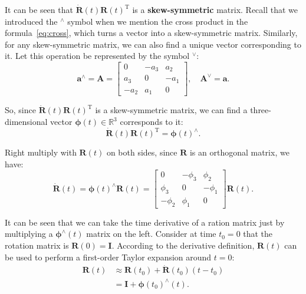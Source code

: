 It can be seen that $\dot{\mathbf{R}} (t) \mathbf{R} {(t)^\mathrm{T}}$ is a \textbf{skew-symmetric} matrix. Recall that we introduced the $^\wedge$ symbol when we mention the cross product in the formula~\eqref{eq:cross}, which turns a vector into a skew-symmetric matrix. Similarly, for any skew-symmetric matrix, we can also find a unique vector corresponding to it. Let this operation be represented by the symbol $^{\vee}$:
\begin{equation}
{\mathbf{a}^ \wedge } = \mathbf{A} = \left[ {\begin{array}{*{20}{c}}
    0&{ - {a_3}}&{{a_2}}\\
    {{a_3}}&0&{ - {a_1}}\\
    { - {a_2}}&{{a_1}}&0
    \end{array}} \right], \quad
{ \mathbf{A}^ \vee } = \mathbf{a}.
\end{equation}

So, since $\dot{\mathbf{R}} (t) \mathbf{R} {(t)^\mathrm{T}}$ is a skew-symmetric matrix, we can find a three-dimensional vector $\boldsymbol{\phi} (t) \in \mathbb{R}^3$ corresponds to it:
\[
\dot{\mathbf{R}} (t) \mathbf{R}(t)^\mathrm{T} = \boldsymbol{\phi} (t) ^ {\wedge}.
\]

Right multiply with $\mathbf{R}(t)$ on both sides, since $\mathbf{R}$ is an orthogonal matrix, we have:
\begin{equation}
\label{eq:dR}
\dot{\mathbf{R}} (t) = \boldsymbol{\phi} (t)^{\wedge} \mathbf{R}(t) =
\left[ {\begin{array}{*{20}{c}}
    0&{ - {\phi _3}}&{{\phi _2}}\\
    {{\phi _3}}&0&{ - {\phi _1}}\\
    { - {\phi _2}}&{{\phi _1}}&0
    \end{array}} \right] \mathbf{R} (t).
\end{equation}

It can be seen that we can take the time derivative of a ration matrix just by multiplying a $\boldsymbol{\phi}^\wedge (t)$ matrix on the left. Consider at time $t_0=0$ that the rotation matrix is $\mathbf{R}(0) = \mathbf{I}$. According to the derivative definition, $\mathbf{R}(t)$ can be used to perform a first-order Taylor expansion around $t=0$:
\begin{equation}
\begin{aligned}
\mathbf{R} \left( t \right) & \approx \mathbf{R} \left( t_0 \right) + \dot {\mathbf{R}} \left( {{t_0}} \right)\left ( {t - {t_0}} \right)\\
&= \mathbf{I} + \boldsymbol{\phi} {\left( {{t_0}} \right)^ \wedge } \left( t \right).
\end{aligned}
\end{equation}


